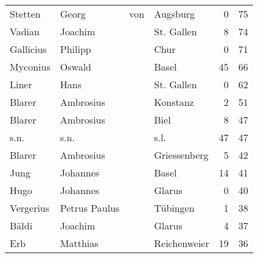 \documentclass[10pt,a4paper,landscape]{article}
\begin{document}
\begin{longtable}{llllrr}
                  Stetten &                              Georg &         von &                                    Augsburg &          0 &        75 \\
                   Vadian &                            Joachim &             &                                  St. Gallen &          8 &        74 \\
                Gallicius &                            Philipp &             &                                        Chur &          0 &        71 \\
                 Myconius &                             Oswald &             &                                       Basel &         45 &        66 \\
                    Liner &                               Hans &             &                                  St. Gallen &          0 &        62 \\
                   Blarer &                          Ambrosius &             &                                    Konstanz &          2 &        51 \\
                   Blarer &                          Ambrosius &             &                                        Biel &          8 &        47 \\
                     s.n. &                               s.n. &             &                                        s.l. &         47 &        47 \\
                   Blarer &                          Ambrosius &             &                                Griessenberg &          5 &        42 \\
                     Jung &                           Johannes &             &                                       Basel &         14 &        41 \\
                     Hugo &                           Johannes &             &                                      Glarus &          0 &        40 \\
                Vergerius &                      Petrus Paulus &             &                                    Tübingen &          1 &        38 \\
                    Bäldi &                            Joachim &             &                                      Glarus &          4 &        37 \\
                      Erb &                           Matthias &             &                                Reichenweier &         19 &        36 \\

\end{longtable}
\end{document}

